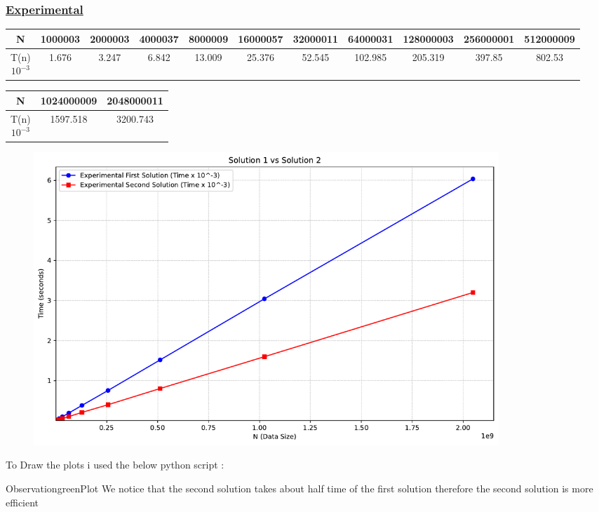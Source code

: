 

\subsubsection*{\underline{Experimental}}

\begin{tabular}{|c|c|c|c|c|c|c|c|c|c|c|}
\hline
N & 1000003 & 2000003 & 4000037 & 8000009 & 16000057 & 32000011 & 64000031 & 128000003 & 256000001 & 512000009 \\
\hline
\makecell{T(n)\\\(10^{-3}\)} & 1.676 & 3.247 & 6.842 & 13.009 & 25.376 & 52.545 & 102.985 & 205.319 & 397.85 & 802.53\\
\hline
\end{tabular}

\vspace{0.25cm}

\begin{tabular}{|c|c|c|}
    \hline
    N & 1024000009 & 2048000011\\
    \hline
    \makecell{T(n)\\\(10^{-3}\)}  & 1597.518 & 3200.743\\
    \hline
\end{tabular}

\vspace{0.5cm}

\begin{figure}[h!]
    \centering
    \includegraphics[width=0.85\textwidth]{Questions/Part2/plot.pdf}
    \label{fig:time_plot}
\end{figure}

\newpage

To Draw the plots i used the below python script :

\vspace{1cm}



\vspace{1cm}

\begin{prettyBox}{Observation}{greenPlot}
We notice that the second solution takes about half time of the first solution therefore the second solution
is more efficient
\end{prettyBox}
